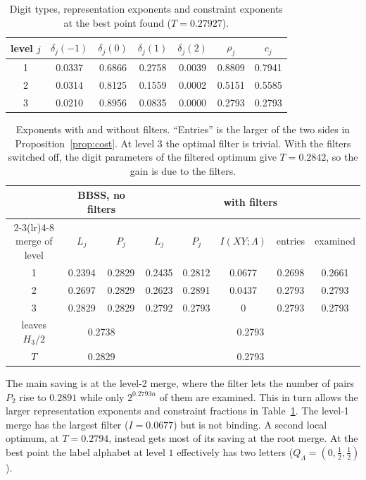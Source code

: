 \documentclass[11pt]{article}
\theoremstyle{definition}
\theoremstyle{remark}
\begin{document}
\begin{table}[ht]
\centering
\begin{tabular}{ccccccc}
\toprule
level $j$ & $\delta_j(-1)$ & $\delta_j(0)$ & $\delta_j(1)$ & $\delta_j(2)$ & $\rho_j$ & $c_j$ \\
\midrule
1 & 0.0337 & 0.6866 & 0.2758 & 0.0039 & 0.8809 & 0.7941 \\
2 & 0.0314 & 0.8125 & 0.1559 & 0.0002 & 0.5151 & 0.5585 \\
3 & 0.0210 & 0.8956 & 0.0835 & 0.0000 & 0.2793 & 0.2793 \\
\bottomrule
\end{tabular}
\caption{Digit types, representation exponents and constraint exponents at the best point found ($T=0.27927$).}
\label{tab:params}
\end{table}

\begin{table}[ht]
\centering
\begin{tabular}{cccccccc}
\toprule
& \multicolumn{2}{c}{BBSS, no filters} & \multicolumn{5}{c}{with filters} \\
\cmidrule(lr){2-3}\cmidrule(lr){4-8}
merge of level & $L_j$ & $P_j$ & $L_j$ & $P_j$ & $I(XY;\Lambda)$ & entries & examined \\
\midrule
1 & 0.2394 & 0.2829 & 0.2435 & 0.2812 & 0.0677 & 0.2698 & 0.2661 \\
2 & 0.2697 & 0.2829 & 0.2623 & 0.2891 & 0.0437 & 0.2793 & 0.2793 \\
3 & 0.2829 & 0.2829 & 0.2792 & 0.2793 & 0      & 0.2793 & 0.2793 \\
\midrule
leaves $H_3/2$ & \multicolumn{2}{c}{0.2738} & \multicolumn{5}{c}{0.2793} \\
$T$ & \multicolumn{2}{c}{0.2829} & \multicolumn{5}{c}{0.2793} \\
\bottomrule
\end{tabular}
\caption{Exponents with and without filters. ``Entries'' is the larger of the two sides in
Proposition~\ref{prop:cost}. At level $3$ the optimal filter is trivial. With the filters switched off, the
digit parameters of the filtered optimum give $T=0.2842$, so the gain is due to the filters.}
\label{tab:compare}
\end{table}

The main saving is at the level-2 merge, where the filter lets the number of pairs $P_2$ rise to $0.2891$ while
only $2^{0.2793n}$ of them are examined. This in turn allows the larger representation exponents and constraint
fractions in Table~\ref{tab:params}. The level-1 merge has the largest filter ($I=0.0677$) but is not binding.
A second local optimum, at $T=0.2794$, instead gets most of its saving at the root merge. At the best point the label
alphabet at level $1$ effectively has two letters ($Q_\Lambda=(0,\tfrac12,\tfrac12)$).
\end{document}
